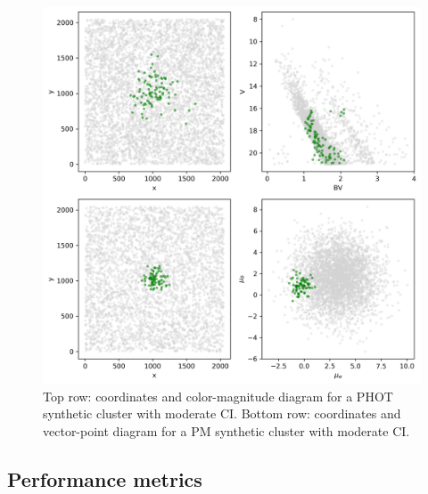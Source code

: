 \documentclass[draft]{aa}
\begin{document}
 \begin{figure}
 \includegraphics[width=\hsize]{figs/synth_clusts.png}
 \caption{Top row: coordinates and color-magnitude diagram for a PHOT synthetic
 cluster with moderate CI.
 Bottom row: coordinates and vector-point diagram for a PM synthetic
 cluster with moderate CI.}
 \label{fig:synth_clust}
 \end{figure}



\subsection{Performance metrics}
 \label{ssec:performance}


\end{document}
